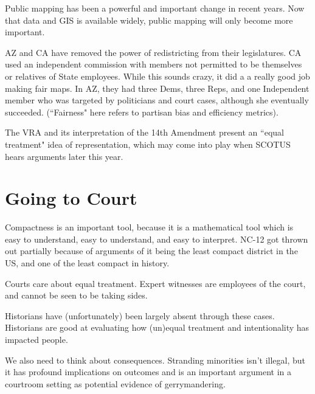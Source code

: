 Public mapping has been a powerful and important change in recent years.  Now that data and GIS is available widely, public mapping will only become more important.

AZ and CA have removed the power of redistricting from their legislatures.  CA used an independent commission with members not permitted to be themselves or relatives of State employees.  While this sounds crazy, it did a a really good job making fair maps.  In AZ, they had three Dems, three Reps, and one Independent member who was targeted by politicians and court cases, although she eventually succeeded. (``Fairness" here refers to partisan bias and efficiency metrics).

The VRA and its interpretation of the 14th Amendment present an ``equal treatment" idea of representation, which may come into play when SCOTUS hears arguments later this year.

\section*{Going to Court}

Compactness is an important tool, because it is a mathematical tool which is easy to understand, easy to understand, and easy to interpret.  NC-12 got thrown out partially because of arguments of it being the least compact district in the US, and one of the least compact in history.

Courts care about equal treatment.  Expert witnesses are employees of the court, and cannot be seen to be taking sides. 

Historians have (unfortunately) been largely absent through these cases.  Historians are good at evaluating how (un)equal treatment and intentionality has impacted people.

We also need to think about consequences.  Stranding minorities isn't illegal, but it has profound implications on outcomes and is an important argument in a courtroom setting as potential evidence of gerrymandering.


















